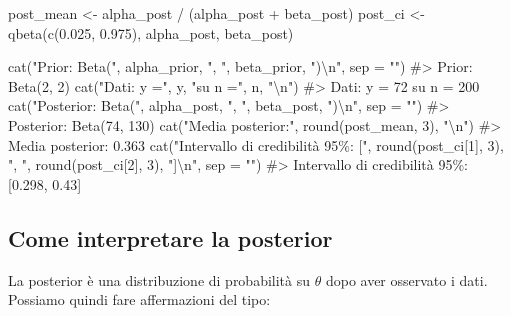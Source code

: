 \documentclass[
  italian,
  letterpaper,
  a4paper,
  11pt,
  open=any]{scrbook}
\newenvironment{Shaded}{\begin{snugshade}}{\end{snugshade}}
\newcommand{\AttributeTok}[1]{\textcolor[rgb]{0.40,0.45,0.13}{#1}}
\newcommand{\CommentTok}[1]{\textcolor[rgb]{0.37,0.37,0.37}{#1}}
\newcommand{\DecValTok}[1]{\textcolor[rgb]{0.68,0.00,0.00}{#1}}
\newcommand{\FloatTok}[1]{\textcolor[rgb]{0.68,0.00,0.00}{#1}}
\newcommand{\FunctionTok}[1]{\textcolor[rgb]{0.28,0.35,0.67}{#1}}
\newcommand{\NormalTok}[1]{\textcolor[rgb]{0.00,0.23,0.31}{#1}}
\newcommand{\OtherTok}[1]{\textcolor[rgb]{0.00,0.23,0.31}{#1}}
\newcommand{\SpecialCharTok}[1]{\textcolor[rgb]{0.37,0.37,0.37}{#1}}
\newcommand{\StringTok}[1]{\textcolor[rgb]{0.13,0.47,0.30}{#1}}
\theoremstyle{plain}
\theoremstyle{definition}
\theoremstyle{definition}
\theoremstyle{remark}
\begin{document}
\begin{Shaded}
\begin{Highlighting}[]
\NormalTok{post\_mean }\OtherTok{\textless{}{-}}\NormalTok{ alpha\_post }\SpecialCharTok{/}\NormalTok{ (alpha\_post }\SpecialCharTok{+}\NormalTok{ beta\_post)}
\NormalTok{post\_ci }\OtherTok{\textless{}{-}} \FunctionTok{qbeta}\NormalTok{(}\FunctionTok{c}\NormalTok{(}\FloatTok{0.025}\NormalTok{, }\FloatTok{0.975}\NormalTok{), alpha\_post, beta\_post)}

\FunctionTok{cat}\NormalTok{(}\StringTok{"Prior: Beta("}\NormalTok{, alpha\_prior, }\StringTok{", "}\NormalTok{, beta\_prior, }\StringTok{")}\SpecialCharTok{\textbackslash{}n}\StringTok{"}\NormalTok{, }\AttributeTok{sep =} \StringTok{""}\NormalTok{)}
\CommentTok{\#\textgreater{} Prior: Beta(2, 2)}
\FunctionTok{cat}\NormalTok{(}\StringTok{"Dati: y ="}\NormalTok{, y, }\StringTok{"su n ="}\NormalTok{, n, }\StringTok{"}\SpecialCharTok{\textbackslash{}n}\StringTok{"}\NormalTok{)}
\CommentTok{\#\textgreater{} Dati: y = 72 su n = 200}
\FunctionTok{cat}\NormalTok{(}\StringTok{"Posterior: Beta("}\NormalTok{, alpha\_post, }\StringTok{", "}\NormalTok{, beta\_post, }\StringTok{")}\SpecialCharTok{\textbackslash{}n}\StringTok{"}\NormalTok{, }\AttributeTok{sep =} \StringTok{""}\NormalTok{)}
\CommentTok{\#\textgreater{} Posterior: Beta(74, 130)}
\FunctionTok{cat}\NormalTok{(}\StringTok{"Media posterior:"}\NormalTok{, }\FunctionTok{round}\NormalTok{(post\_mean, }\DecValTok{3}\NormalTok{), }\StringTok{"}\SpecialCharTok{\textbackslash{}n}\StringTok{"}\NormalTok{)}
\CommentTok{\#\textgreater{} Media posterior: 0.363}
\FunctionTok{cat}\NormalTok{(}\StringTok{"Intervallo di credibilità 95\%: ["}\NormalTok{,}
    \FunctionTok{round}\NormalTok{(post\_ci[}\DecValTok{1}\NormalTok{], }\DecValTok{3}\NormalTok{), }\StringTok{", "}\NormalTok{, }\FunctionTok{round}\NormalTok{(post\_ci[}\DecValTok{2}\NormalTok{], }\DecValTok{3}\NormalTok{), }\StringTok{"]}\SpecialCharTok{\textbackslash{}n}\StringTok{"}\NormalTok{, }\AttributeTok{sep =} \StringTok{""}\NormalTok{)}
\CommentTok{\#\textgreater{} Intervallo di credibilità 95\%: [0.298, 0.43]}
\end{Highlighting}
\end{Shaded}

\subsection{Come interpretare la
posterior}\label{come-interpretare-la-posterior}

La posterior è una distribuzione di probabilità su \(\theta\) dopo aver
osservato i dati. Possiamo quindi fare affermazioni del tipo:
\end{document}
